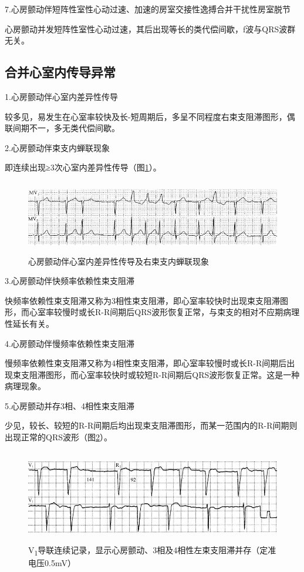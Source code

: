 7.心房颤动伴短阵性室性心动过速、加速的房室交接性逸搏合并干扰性房室脱节

心房颤动并发短阵性室性心动过速，其后出现等长的类代偿间歇，f波与QRS波群无关。

\protect\hypertarget{text00020.htmlux5cux23subid206}{}{}

\subsection{合并心室内传导异常}

1.心房颤动伴心室内差异性传导

较多见，易发生在心室率较快及长-短周期后，多呈不同程度右束支阻滞图形，偶联间期不一，多无类代偿间歇。

2.心房颤动伴束支内蝉联现象

即连续出现≥3次心室内差异性传导（图\ref{fig13-24}）。

\begin{figure}[!htbp]
 \centering
 \includegraphics[width=5.58333in,height=1.26042in]{./images/Image00232.jpg}
 \captionsetup{justification=centering}
 \caption{心房颤动伴心室内差异性传导及右束支内蝉联现象}
 \label{fig13-24}
  \end{figure} 

3.心房颤动伴快频率依赖性束支阻滞

快频率依赖性束支阻滞又称为3相性束支阻滞，即心室率较快时出现束支阻滞图形，而心室率较慢时或长R-R间期后QRS波形恢复正常，与束支的相对不应期病理性延长有关。

4.心房颤动伴慢频率依赖性束支阻滞

慢频率依赖性束支阻滞又称为4相性束支阻滞，即心室率较慢时或长R-R间期后出现束支阻滞图形，而心室率较快时或较短R-R间期后QRS波形恢复正常。这是一种病理现象。

5.心房颤动并存3相、4相性束支阻滞

少见，较长、较短的R-R间期后均出现束支阻滞图形，而某一范围内的R-R间期则出现正常的QRS波形（图\ref{fig13-25}）。

\begin{figure}[!htbp]
 \centering
 \includegraphics[width=5.58333in,height=1.60417in]{./images/Image00233.jpg}
 \captionsetup{justification=centering}
 \caption{V\textsubscript{1}导联连续记录，显示心房颤动、3相及4相性左束支阻滞并存（定准电压0.5mV）}
 \label{fig13-25}
  \end{figure} 


